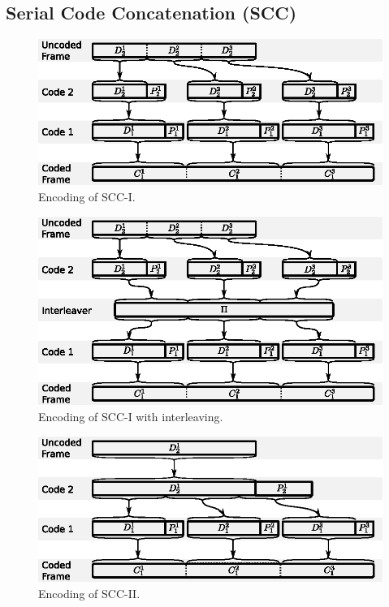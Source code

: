 \documentclass[conference]{IEEEtran}
\newcommand{\ScaleA}{1.0} %
\begin{document}
\subsection{Serial Code Concatenation (SCC)} \label{sec:serial_schemes}

\begin{figure}[t]
  \centerline{\includegraphics[width=\ScaleA\columnwidth]{figures_sources/drawing_v10_scheme_1.eps}}%
  \caption{Encoding of SCC-I.}
    \label{fig:scheme1}
\end{figure}

\begin{figure}[t]
  \centerline{\includegraphics[width=\ScaleA\columnwidth]{figures_sources/drawing_v10_scheme_3.eps}}%
  \caption{Encoding of SCC-I with interleaving.}
    \label{fig:scheme3}
\end{figure}

\begin{figure}[t]
  \centerline{\includegraphics[width=\ScaleA\columnwidth]{figures_sources/drawing_v10_scheme_2.eps}}%
    \caption{Encoding of SCC-II.}
    \label{fig:scheme2}
\end{figure}
\end{document}
